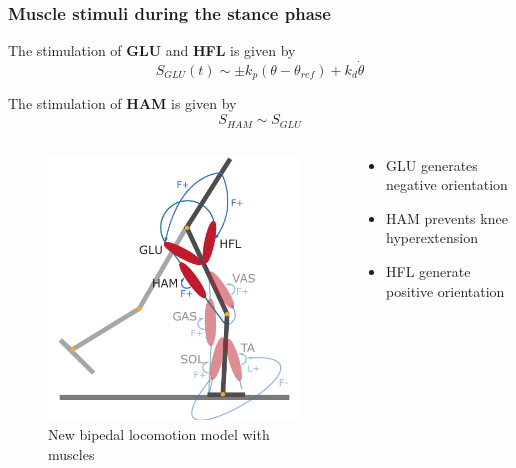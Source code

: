 \documentclass[10pt]{beamer}
\begin{document}
\begin{frame}
	\frametitle{Muscle stimuli during the stance phase}
	
	\begin{block}{}
		The stimulation of \textbf{GLU} and \textbf{HFL}  is given by
		\begin{equation*}
			S_{GLU}(t) \sim \pm k_p (\theta-\theta_{ref}) + k_d \dot{\theta}
		\end{equation*}
	\end{block}
	\begin{block}{}
		The stimulation of \textbf{HAM} is given by	
		\begin{equation*}
			S_{HAM} \sim S_{GLU}
		\end{equation*}
	\end{block}		
	
	
	\begin{columns}
		\begin{column}{.5\textwidth}
			\begin{figure}
				\centering
				\includegraphics[height=.45\textheight]{images/new_model/stance/muscle_vas_sol_gas_ta_ham_glu_hfl_floor.pdf}
				\caption{New bipedal locomotion model with muscles}	
			\end{figure}
		\end{column}
		\begin{column}{.5\textwidth}
			\begin{itemize}
				\item GLU generates negative orientation
				\item HAM prevents knee hyperextension
				\item HFL generate positive orientation				
			\end{itemize}
		\end{column}
	\end{columns}
\end{frame}
\end{document}
